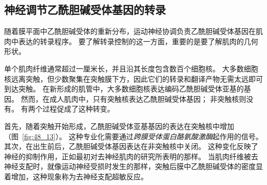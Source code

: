 \subsection{神经调节乙酰胆碱受体基因的转录}

随着膜平面中乙酰胆碱受体的重新分布，运动神经协调负责乙酰胆碱受体基因在肌肉中表达的转录程序。
要了解转录控制的这一方面，重要的是要了解肌肉的几何形状。


单个肌肉纤维通常超过一厘米长，并且沿其长度包含数百个细胞核。
大多数细胞核远离突触，但少数聚集在突触膜下方，因此它们的转录和翻译产物无需太远即可到达突触。
在新形成的肌管中，大多数细胞核表达编码乙酰胆碱受体亚基的基因。
然而，在成人肌肉中，只有突触核表达乙酰胆碱受体基因；
非突触核则没有。
有两个过程促成了这种转变。


首先，随着突触开始形成，乙酰胆碱受体亚基基因的表达在突触核中增加（图~\ref{fig:48_13}）。
这种专业化需要通过\textit{跨膜受体蛋白酪氨酸激酶}起作用的信号。
其次，在出生前后，乙酰胆碱受体基因表达在非突触核中关闭。
这种变化反映了神经的抑制作用，正如最初对去神经肌肉的研究所表明的那样。
当肌肉纤维被去神经支配时，就像运动神经受损时发生的那样，突触后膜中乙酰胆碱受体的密度显着增加，这种现象称为去神经支配超敏反应。


